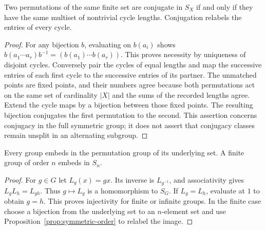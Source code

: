 \begin{proposition}\label{prop:permutation-conjugacy}
Two permutations of the same finite set are conjugate in $S_X$ if and only if they have the same multiset of nontrivial cycle lengths. Conjugation relabels the entries of every cycle.
\end{proposition}
\begin{proof}
For any bijection $b$, evaluating on $b(a_i)$ shows
$b(a_1\cdots a_r)b^{-1}=(b(a_1)\cdots b(a_r))$. This proves necessity by uniqueness of disjoint cycles. Conversely pair the cycles of equal lengths and map the successive entries of each first cycle to the successive entries of its partner. The unmatched points are fixed points, and their numbers agree because both permutations act on the same set of cardinality $|X|$ and the sums of the recorded lengths agree. Extend the cycle maps by a bijection between those fixed points. The resulting bijection conjugates the first permutation to the second. This assertion concerns conjugacy in the full symmetric group; it does not assert that conjugacy classes remain unsplit in an alternating subgroup.
\end{proof}

\begin{theorem}\label{thm:cayley}
Every group embeds in the permutation group of its underlying set. A finite group of order $n$ embeds in $S_n$.
\end{theorem}
\begin{proof}
For $g\in G$ let $L_g(x)=gx$. Its inverse is $L_{g^{-1}}$, and associativity gives $L_gL_h=L_{gh}$. Thus $g\mapsto L_g$ is a homomorphism to $S_G$. If $L_g=L_h$, evaluate at $1$ to obtain $g=h$. This proves injectivity for finite or infinite groups. In the finite case choose a bijection from the underlying set to an $n$-element set and use Proposition~\ref{prop:symmetric-order} to relabel the image.
\end{proof}

